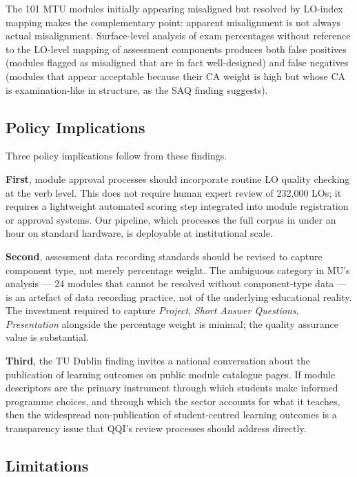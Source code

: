 \documentclass[12pt, a4paper]{article}
\begin{document}
The 101 MTU modules initially appearing misaligned but resolved by LO-index mapping
makes the complementary point: apparent misalignment is not always actual misalignment.
Surface-level analysis of exam percentages without reference to the LO-level mapping
of assessment components produces both false positives (modules flagged as misaligned
that are in fact well-designed) and false negatives (modules that appear acceptable
because their CA weight is high but whose CA is examination-like in structure, as the
SAQ finding suggests).

\subsection{Policy Implications}

Three policy implications follow from these findings.

\textbf{First}, module approval processes should incorporate routine LO quality
checking at the verb level. This does not require human expert review of 232,000
LOs; it requires a lightweight automated scoring step integrated into module
registration or approval systems. Our pipeline, which processes the full corpus in
under an hour on standard hardware, is deployable at institutional scale.

\textbf{Second}, assessment data recording standards should be revised to capture
component type, not merely percentage weight. The ambiguous category in MU's
analysis --- 24 modules that cannot be resolved without component-type data ---
is an artefact of data recording practice, not of the underlying educational reality.
The investment required to capture \textit{Project}, \textit{Short Answer Questions},
\textit{Presentation} alongside the percentage weight is minimal; the quality
assurance value is substantial.

\textbf{Third}, the TU Dublin finding invites a national conversation about the
publication of learning outcomes on public module catalogue pages. If module
descriptors are the primary instrument through which students make informed programme
choices, and through which the sector accounts for what it teaches, then the
widespread non-publication of student-centred learning outcomes is a transparency
issue that QQI's review processes should address directly.

\subsection{Limitations}
\end{document}
